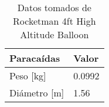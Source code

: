 \begin{table}[h]
\centering

\begin{tabular}{ll}
\toprule
\textbf{Paracaídas}                    & \textbf{Valor}  \\
\midrule
Peso [kg]                 & 0.0992    \\
Diámetro  [m]  & 1.56   \\
\bottomrule
\end{tabular}
\caption{Datos tomados de Rocketman 4ft High Altitude Balloon}
\label{tab:paracaidas_datos}
\end{table}